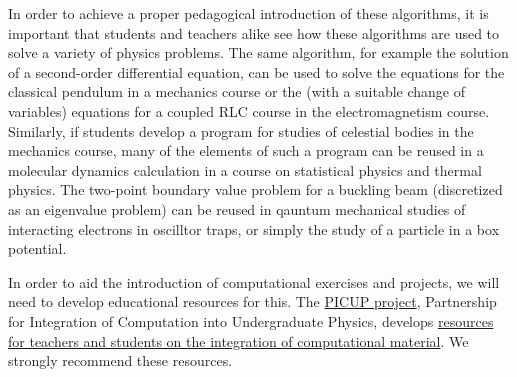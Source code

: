 \documentclass[%
oneside,                 %
final,                   %
10pt]{article}
\begin{document}
\noindent
In order to achieve a proper pedagogical introduction of these algorithms, it is important that students and teachers alike see how these algorithms are used to solve a variety of physics problems. The same algorithm, for example the solution of a second-order differential equation, can be used to solve the equations for the classical pendulum in a mechanics course or the (with a suitable change of variables) equations for a coupled RLC course in the electromagnetism course. Similarly, if students develop a program for studies of celestial bodies in the mechanics course, many of the elements of such a program can be reused in a molecular dynamics calculation in a course on statistical physics and thermal physics. The two-point boundary value problem for a buckling beam
(discretized as an eigenvalue problem) can be reused in qauntum mechanical studies of interacting electrons in oscilltor traps, or simply the study of a particle in a box potential. 

In order to aid the introduction of computational exercises and projects, we will need to develop educational resources for this. The \href{{http://www.compadre.org/picup/}}{PICUP project},  Partnership for Integration of Computation into Undergraduate Physics, develops \href{{http://www.compadre.org/PICUP/resources/}}{resources for teachers and students on the integration of computational  material}.   We strongly recommend these resources.
\end{document}
